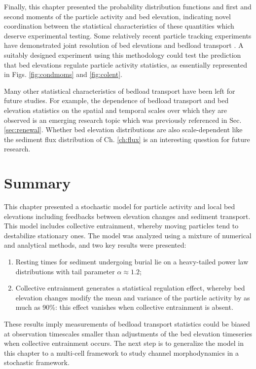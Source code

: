 Finally, this chapter presented the probability distribution functions and first and second moments of the particle activity and bed elevation, indicating novel coordination between the statistical characteristics of these quantities which deserve experimental testing.
Some relatively recent particle tracking experiments have demonstrated joint resolution of bed elevations and bedload transport \citep{Martin2014,Heyman2016}.
A suitably designed experiment using this methodology could test the prediction that bed elevations regulate particle activity statistics, as essentially represented in Figs. \ref{fig:condmoms} and \ref{fig:colent}. 

Many other statistical characteristics of bedload transport have been left for future studies. 
For example, the dependence of bedload transport \citep{Saletti2015,Singh2009} and bed elevation statistics \citep{Aberle2006, Singh2009,Singh2012} on the spatial and temporal scales over which they are observed is an emerging research topic which was previously referenced in Sec. \ref{sec:renewal}.
Whether bed elevation distributions are also scale-dependent like the sediment flux distribution of Ch. \ref{ch:flux} is an interesting question for future research.

\section{Summary}
\label{sec:eleconclusion}

This chapter presented a stochastic model for particle activity and local bed elevations including feedbacks between elevation changes and sediment transport.
This model includes collective entrainment, whereby moving particles tend to destabilize stationary ones.
The model was analyzed using a mixture of numerical and analytical methods, and two key results were presented:
\begin{enumerate}
	\item Resting times for sediment undergoing burial lie on a heavy-tailed power law distributions with tail parameter $\alpha \approx 1.2$;
	\item Collective entrainment generates a statistical regulation effect, whereby bed elevation changes modify the mean and variance of the particle activity by as much as 90\%: this effect vanishes when collective entrainment is absent.
\end{enumerate}
These results imply measurements of bedload transport statistics could be biased at observation timescales smaller than adjustments of the bed elevation timeseries when collective entrainment occurs.
The next step is to generalize the model in this chapter to a multi-cell framework to study channel morphodynamics in a stochastic framework.
